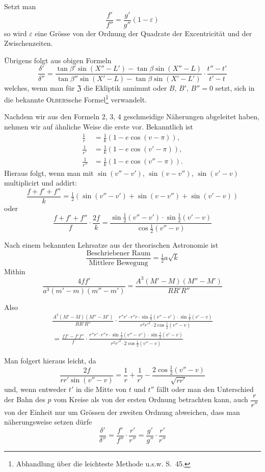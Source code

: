 \documentclass[10pt,a4paper]{article}
\begin{document}
Setzt man
\[
\frac{f'}{f''} = \frac{g'}{g''}(1 - \varepsilon)
\]
so wird $\varepsilon$ eine Grösse von der Ordnung der Quadrate der Excentricität und der Zwischenzeiten.

Übrigens folgt aus obigen Formeln
\[
\frac{\delta'}{\delta''} = \frac{\tan\beta'\sin(X'' - L') - \tan\beta\sin(X'' - L)}{\tan\beta''\sin(X' - L) - \tan\beta\sin(X' - L')} \cdot \frac{t'' - t'}{t' - t}
\]
welches, wenn man für $\mathfrak{Z}$ die Ekliptik annimmt oder $B$, $B'$, $B'' = 0$ setzt, sich in die bekannte \textsc{Olbers}sche Formel\footnote{Abhandlung über die leichteste Methode u.s.w. S.~45.} verwandelt.

Nachdem wir aus den Formeln 2, 3, 4 geschmeidige Näherungen abgeleitet haben, nehmen wir auf ähnliche Weise die erste vor. Bekanntlich ist
\begin{align*}
\frac{1}{r} &= \tfrac{1}{k}(1 - e\cos(v - \pi)), \\
\frac{1}{r'} &= \tfrac{1}{k}(1 - e\cos(v' - \pi)), \\
\frac{1}{r''} &= \tfrac{1}{k}(1 - e\cos(v'' - \pi)).
\end{align*}
Hieraus folgt, wenn man mit $\sin(v'' - v')$, $\sin(v - v'')$, $\sin(v' - v)$ multiplicirt und addirt:
\[
\frac{f + f' + f''}{k} = \tfrac{1}{2}(\sin(v'' - v') + \sin(v - v'') + \sin(v' - v))
\]
oder
\[
\frac{f + f' + f''}{f} \cdot \frac{2f}{k} = \frac{\sin\tfrac{1}{2}(v'' - v') \cdot \sin\tfrac{1}{2}(v' - v)}{\cos\tfrac{1}{2}(v'' - v)}
\]

Nach einem bekannten Lehrsatze aus der theorischen Astronomie ist
\[
\frac{\text{Beschriebener Raum}}{\text{Mittlere Bewegung}} = \tfrac{1}{2}a\sqrt{k}
\]
Mithin
\[
\frac{4ff'}{a^3(m' - m)(m'' - m')} = \frac{A^3(M' - M)(M'' - M')}{RR'R''}
\]

\clearpage
\noindent
Also
\begin{multline*}
\frac{A^3(M' - M)(M'' - M')}{RR'R''} \cdot \frac{r''r' \cdot r''r \cdot \sin\tfrac{1}{2}(v'' - v') \cdot \sin\tfrac{1}{2}(v' - v)}{r^2r'^2 \cdot 2\cos\tfrac{1}{2}(v'' - v)} \\
= \frac{ff' - f'f''}{f} \cdot \frac{r''r' \cdot r''r \cdot \sin\tfrac{1}{2}(v'' - v') \cdot \sin\tfrac{1}{2}(v' - v)}{r^2r'^2 \cdot 2\cos\tfrac{1}{2}(v'' - v)}
\end{multline*}

Man folgert hieraus leicht, da
\[
\frac{2f}{rr'\sin(v'' - v)} = \frac{1}{r} + \frac{1}{r'} - \frac{2\cos\tfrac{1}{2}(v'' - v)}{\sqrt{rr'}}
\]
und, wenn entweder $t'$ in die Mitte von $t$ und $t''$ fällt oder man den Unterschied der Bahn des $p$ vom Kreise als von der ersten Ordnung betrachten kann, auch $\dfrac{r}{r''}$ von der Einheit nur um Grössen der zweiten Ordnung abweichen, dass man näherungsweise setzen dürfe
\[
\frac{\delta'}{\delta''} = \frac{f'}{f''} \cdot \frac{r'}{r''} = \frac{g'}{g''} \cdot \frac{r'}{r''}
\]
\end{document}
